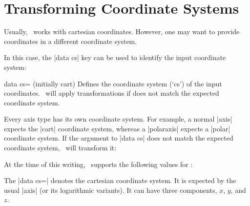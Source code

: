 \section{Transforming Coordinate Systems}
\label{key:data:cs}
Usually, \PGFPlots\ works with cartesian coordinates. However, one may want to provide coordinates in a different coordinate system.

In this case, the |data cs| key can be used to identify the input coordinate system:

\begin{pgfplotskey}{data cs= (initially cart)}
	Defines the coordinate system (`cs') of the input coordinates. \PGFPlots\ will apply transformations if  does not match the expected coordinate system.
\begin{codeexample}[]
\end{codeexample}
\begin{codeexample}[]
\end{codeexample}
	Every axis type has its own coordinate system. For example, a normal |axis| expects the |cart| coordinate system, whereas a |polaraxis| expects a |polar| coordinate system. If the argument to |data cs| does not match the expected coordinate system, \PGFPlots\ will transform it:
\begin{codeexample}[]
\end{codeexample}
	
	At the time of this writing, \PGFPlots\ supports the following values for :

	The |data cs=| denotes the cartesian coordinate system. It is expected by the usual |axis| (or its logarithmic variants). It can have three components, $x$, $y$, and $z$.


\end{pgfplotskey}
